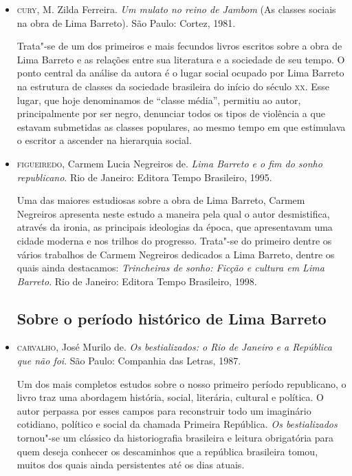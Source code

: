 \documentclass[11pt]{extarticle}
\begin{document}
{{\begin{itemize}
\item \textsc{cury}, M. Zilda Ferreira. \emph{Um mulato no reino de
Jambom} (As classes sociais na obra de Lima Barreto). São
Paulo: Cortez, 1981. 

Trata"-se de um dos primeiros e mais fecundos livros
escritos sobre a obra de Lima Barreto e as relações entre sua literatura
e a sociedade de seu tempo. O ponto central da análise da autora é o
lugar social ocupado por Lima Barreto na estrutura de classes da
sociedade brasileira do início do século \textsc{xx}. Esse lugar, que hoje
denominamos de ``classe média'', permitiu ao autor, principalmente por
ser negro, denunciar todos os tipos de violência a que estavam
submetidas as classes populares, ao mesmo tempo em que estimulava o
escritor a ascender na hierarquia social.

\item \textsc{figueiredo}, Carmem Lucia Negreiros de. \emph{Lima Barreto e o fim do
sonho republicano}. Rio de Janeiro: Editora Tempo Brasileiro, 1995. 

Uma
das maiores estudiosas sobre a obra de Lima Barreto, Carmem Negreiros
apresenta neste estudo a maneira pela qual o autor desmistifica, através
da ironia, as principais ideologias da época, que apresentavam uma
cidade moderna e nos trilhos do progresso. Trata"-se do primeiro dentre
os vários trabalhos de Carmem Negreiros dedicados a Lima Barreto, dentre
os quais ainda destacamos: \emph{Trincheiras de sonho: Ficção e cultura
em Lima Barreto}. Rio de Janeiro: Editora Tempo Brasileiro, 1998.

\subsection{Sobre o período histórico de Lima Barreto}

\item  \textsc{carvalho}, José Murilo de. \emph{Os bestializados: o Rio de Janeiro e a
República que não foi}. São Paulo: Companhia das Letras, 1987. 

Um dos
mais completos estudos sobre o nosso primeiro período republicano, o
livro traz uma abordagem história, social, literária, cultural e
política. O autor perpassa por esses campos para reconstruir todo um
imaginário cotidiano, político e social da chamada Primeira República.
\emph{Os bestializados} tornou"-se um clássico da historiografia
brasileira e leitura obrigatória para quem deseja conhecer os
descaminhos que a república brasileira tomou, muitos dos quais ainda
persistentes até os dias atuais.


\end{itemize}}}
\end{document}
